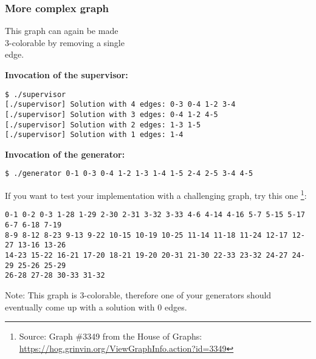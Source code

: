 \vspace{7mm}
\begin{multicols}{2}
\subsubsection*{More complex graph}


\vfill

This graph can again be made\\
3-colorable by removing a single\\
edge.

\columnbreak

\textbf{Invocation of the supervisor:}
\vspace{-5mm}
\begin{verbatim}
$ ./supervisor
[./supervisor] Solution with 4 edges: 0-3 0-4 1-2 3-4
[./supervisor] Solution with 3 edges: 0-4 1-2 4-5
[./supervisor] Solution with 2 edges: 1-3 1-5
[./supervisor] Solution with 1 edges: 1-4
\end{verbatim}

\textbf{Invocation of the generator:}
\vspace{-5mm}
\begin{verbatim}
$ ./generator 0-1 0-3 0-4 1-2 1-3 1-4 1-5 2-4 2-5 3-4 4-5
\end{verbatim}
\end{multicols}

\vspace{5mm}
If you want to test your implementation with a challenging graph, try this one
\footnote{
Source: Graph \#3349 from the House of Graphs:
\url{https://hog.grinvin.org/ViewGraphInfo.action?id=3349}
}:

\texttt{0-1 0-2 0-3 1-28 1-29 2-30 2-31 3-32 3-33 4-6 4-14 4-16 5-7 5-15 5-17 6-7 6-18 7-19\\
8-9 8-12 8-23 9-13 9-22 10-15 10-19 10-25 11-14 11-18 11-24 12-17 12-27 13-16 13-26\\
14-23 15-22 16-21 17-20 18-21 19-20 20-31 21-30 22-33 23-32 24-27 24-29 25-26 25-29\\
26-28 27-28 30-33 31-32}

Note: This graph is 3-colorable,
therefore one of your generators should eventually come up with a solution with 0 edges.

\osueguidelinesone


